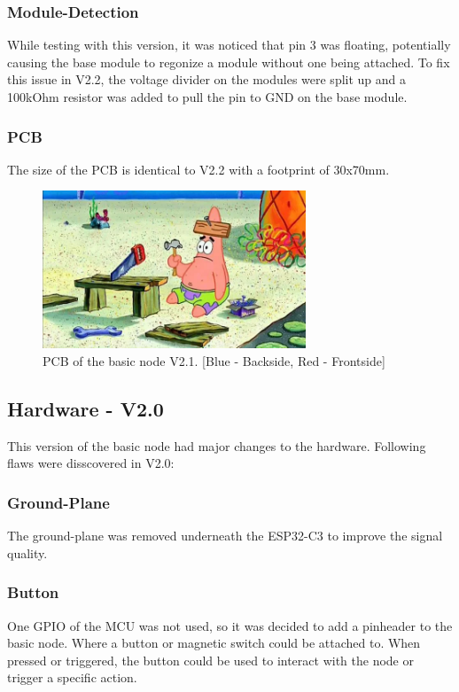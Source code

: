    \subsubsection{Module-Detection}
        While testing with this version, it was noticed that pin 3 was floating,
        potentially causing the base module to regonize a module without one being attached.
        To fix this issue in V2.2, the voltage divider on the modules were split up and
        a 100kOhm resistor was added to pull the pin to GND on the base module.

    \subsubsection{PCB}
        The size of the PCB is identical to V2.2 with a footprint of 30x70mm. 

    \begin{figure}[H]
        \centering
        \includegraphics[width=0.7\textwidth]{assets/HW/TBD.png}
        \caption{PCB of the basic node V2.1. [Blue - Backside, Red - Frontside]}
    \end{figure}


\subsection{Hardware - V2.0}

    This version of the basic node had major changes to the hardware. Following flaws
    were disscovered in V2.0:

    \subsubsection{Ground-Plane}
        The ground-plane was removed underneath the ESP32-C3 to improve the
        signal quality. 

    \subsubsection{Button}
        One GPIO of the MCU was not used, so it was decided to add a pinheader to the basic node.
        Where a button or magnetic switch could be attached to. When pressed or triggered, the
        button could be used to interact with the node or trigger a specific action.

